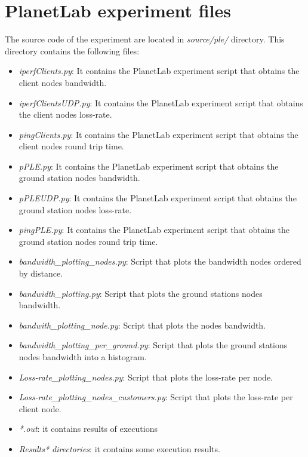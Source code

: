 \section{PlanetLab experiment files}
The source code of the  \pl experiment are located in \emph{source/ple/} directory.
This directory contains the following files:
\begin{itemize}
\item \emph{iperfClients.py}: It contains the PlanetLab experiment script that obtains the client nodes bandwidth.
\item \emph{iperfClientsUDP.py}: It contains the PlanetLab experiment script that obtains the client nodes loss-rate.
\item \emph{pingClients.py}: It contains the PlanetLab experiment script that obtains the client nodes round trip time.
\item \emph{pPLE.py}: It contains the PlanetLab experiment script that obtains the ground station nodes bandwidth.
\item \emph{pPLEUDP.py}: It contains the PlanetLab experiment script that obtains the ground station nodes loss-rate.
\item \emph{pingPLE.py}: It contains the PlanetLab experiment script that obtains the ground station nodes round trip time.
\item \emph{bandwidth\_plotting\_nodes.py}: Script that plots the bandwidth nodes ordered by distance.
\item \emph{bandwidth\_plotting.py}: Script that plots the ground stations nodes bandwidth.
\item \emph{bandwith\_plotting\_node.py}: Script that plots the nodes bandwidth.
\item \emph{bandwidth\_plotting\_per\_ground.py}: Script that plots the ground stations nodes bandwidth into a histogram.
\item \emph{Loss-rate\_plotting\_nodes.py}: Script that plots the loss-rate per node.
\item \emph{Loss-rate\_plotting\_nodes\_customers.py}: Script that plots the loss-rate per client node.
\item \emph{*.out}: it contains results of executions
\item \emph{Results* directories}: it contains some execution results.
\end{itemize}
